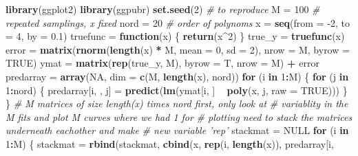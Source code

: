 \documentclass[]{article}
\newenvironment{Shaded}{\begin{snugshade}}{\end{snugshade}}
\newcommand{\KeywordTok}[1]{\textcolor[rgb]{0.13,0.29,0.53}{\textbf{#1}}}
\newcommand{\DataTypeTok}[1]{\textcolor[rgb]{0.13,0.29,0.53}{#1}}
\newcommand{\DecValTok}[1]{\textcolor[rgb]{0.00,0.00,0.81}{#1}}
\newcommand{\FloatTok}[1]{\textcolor[rgb]{0.00,0.00,0.81}{#1}}
\newcommand{\StringTok}[1]{\textcolor[rgb]{0.31,0.60,0.02}{#1}}
\newcommand{\CommentTok}[1]{\textcolor[rgb]{0.56,0.35,0.01}{\textit{#1}}}
\newcommand{\OtherTok}[1]{\textcolor[rgb]{0.56,0.35,0.01}{#1}}
\newcommand{\ControlFlowTok}[1]{\textcolor[rgb]{0.13,0.29,0.53}{\textbf{#1}}}
\newcommand{\OperatorTok}[1]{\textcolor[rgb]{0.81,0.36,0.00}{\textbf{#1}}}
\newcommand{\NormalTok}[1]{#1}
\begin{document}
\begin{Shaded}
\begin{Highlighting}[]
\KeywordTok{library}\NormalTok{(ggplot2)}
\KeywordTok{library}\NormalTok{(ggpubr)}
\KeywordTok{set.seed}\NormalTok{(}\DecValTok{2}\NormalTok{)  }\CommentTok{# to reproduce}
\NormalTok{M =}\StringTok{ }\DecValTok{100}  \CommentTok{# repeated samplings, x fixed }
\NormalTok{nord =}\StringTok{ }\DecValTok{20}  \CommentTok{# order of polynoms}
\NormalTok{x =}\StringTok{ }\KeywordTok{seq}\NormalTok{(}\DataTypeTok{from =} \DecValTok{-2}\NormalTok{, }\DataTypeTok{to =} \DecValTok{4}\NormalTok{, }\DataTypeTok{by =} \FloatTok{0.1}\NormalTok{)}
\NormalTok{truefunc =}\StringTok{ }\ControlFlowTok{function}\NormalTok{(x) \{}
    \KeywordTok{return}\NormalTok{(x}\OperatorTok{^}\DecValTok{2}\NormalTok{)}
\NormalTok{\}}
\NormalTok{true_y =}\StringTok{ }\KeywordTok{truefunc}\NormalTok{(x)}
\NormalTok{error =}\StringTok{ }\KeywordTok{matrix}\NormalTok{(}\KeywordTok{rnorm}\NormalTok{(}\KeywordTok{length}\NormalTok{(x) }\OperatorTok{*}\StringTok{ }\NormalTok{M, }\DataTypeTok{mean =} \DecValTok{0}\NormalTok{, }\DataTypeTok{sd =} \DecValTok{2}\NormalTok{), }\DataTypeTok{nrow =}\NormalTok{ M, }\DataTypeTok{byrow =} \OtherTok{TRUE}\NormalTok{)}
\NormalTok{ymat =}\StringTok{ }\KeywordTok{matrix}\NormalTok{(}\KeywordTok{rep}\NormalTok{(true_y, M), }\DataTypeTok{byrow =}\NormalTok{ T, }\DataTypeTok{nrow =}\NormalTok{ M) }\OperatorTok{+}\StringTok{ }\NormalTok{error}
\NormalTok{predarray =}\StringTok{ }\KeywordTok{array}\NormalTok{(}\OtherTok{NA}\NormalTok{, }\DataTypeTok{dim =} \KeywordTok{c}\NormalTok{(M, }\KeywordTok{length}\NormalTok{(x), nord))}
\ControlFlowTok{for}\NormalTok{ (i }\ControlFlowTok{in} \DecValTok{1}\OperatorTok{:}\NormalTok{M) \{}
    \ControlFlowTok{for}\NormalTok{ (j }\ControlFlowTok{in} \DecValTok{1}\OperatorTok{:}\NormalTok{nord) \{}
\NormalTok{        predarray[i, , j] =}\StringTok{ }\KeywordTok{predict}\NormalTok{(}\KeywordTok{lm}\NormalTok{(ymat[i, ] }\OperatorTok{~}\StringTok{ }\KeywordTok{poly}\NormalTok{(x, j, }\DataTypeTok{raw =} \OtherTok{TRUE}\NormalTok{)))}
\NormalTok{    \}}
\NormalTok{\}}
\CommentTok{# M matrices of size length(x) times nord first, only look at}
\CommentTok{# variablity in the M fits and plot M curves where we had 1 for}
\CommentTok{# plotting need to stack the matrices underneath eachother and make}
\CommentTok{# new variable 'rep'}
\NormalTok{stackmat =}\StringTok{ }\OtherTok{NULL}
\ControlFlowTok{for}\NormalTok{ (i }\ControlFlowTok{in} \DecValTok{1}\OperatorTok{:}\NormalTok{M) \{}
\NormalTok{    stackmat =}\StringTok{ }\KeywordTok{rbind}\NormalTok{(stackmat, }\KeywordTok{cbind}\NormalTok{(x, }\KeywordTok{rep}\NormalTok{(i, }\KeywordTok{length}\NormalTok{(x)), predarray[i, }

\end{Highlighting}
\end{Shaded}
\end{document}
